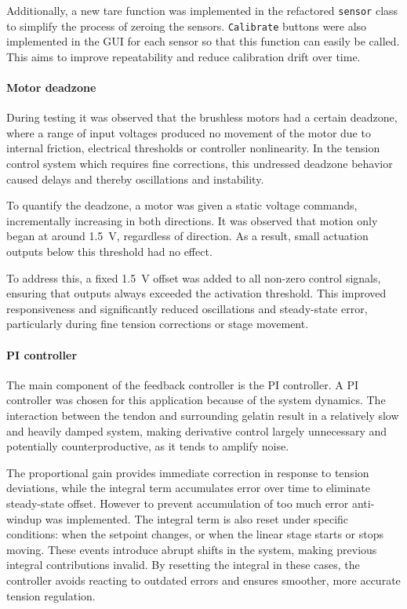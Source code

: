 Additionally, a new tare function was implemented in the refactored \texttt{sensor} class to simplify the process of zeroing the sensors. \texttt{Calibrate} buttons were also implemented in the GUI for each sensor so that this function can easily be called. This aims to improve repeatability and reduce calibration drift over time.

\paragraph*{Motor deadzone}
During testing it was observed that the brushless motors had a certain deadzone, where a range of input voltages produced no movement of the motor due to internal friction, electrical thresholds or controller nonlinearity. In the tension control system which requires fine corrections, this undressed deadzone behavior caused delays and thereby oscillations and instability.

To quantify the deadzone, a motor was given a static voltage commands, incrementally increasing in both directions. It was observed that motion only began at around \SI{1.5}{\volt}, regardless of direction. As a result, small actuation outputs below this threshold had no effect.

To address this, a fixed \SI{1.5}{\volt} offset was added to all non-zero control signals, ensuring that outputs always exceeded the activation threshold. This improved responsiveness and significantly reduced oscillations and steady-state error, particularly during fine tension corrections or stage movement.

\paragraph*{PI controller}
The main component of the feedback controller is the PI controller. A PI controller was chosen for this application because of the system dynamics. The interaction between the tendon and surrounding gelatin result in a relatively slow and heavily damped system, making derivative control largely unnecessary and potentially counterproductive, as it tends to amplify noise.

The proportional gain provides immediate correction in response to tension deviations, while the integral term accumulates error over time to eliminate steady-state offset. However to prevent accumulation of too much error anti-windup was implemented. The integral term is also reset under specific conditions: when the setpoint changes, or when the linear stage starts or stops moving. These events introduce abrupt shifts in the system, making previous integral contributions invalid. By resetting the integral in these cases, the controller avoids reacting to outdated errors and ensures smoother, more accurate tension regulation. 

